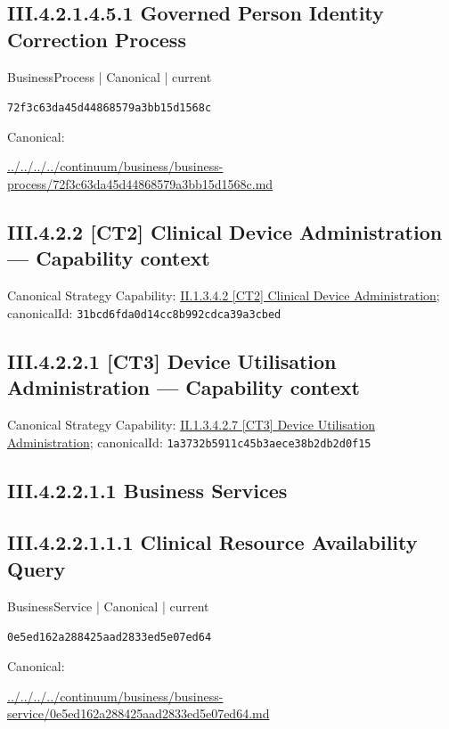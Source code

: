 \documentclass[10pt,a4paper]{article}
\begin{document}
\subsection*{III.4.2.1.4.5.1 Governed Person Identity Correction Process}
\label{element-72f3c63da45d44868579a3bb15d1568c}
{\small BusinessProcess | Canonical | current}\par
\texttt{72f3c63da45d44868579a3bb15d1568c}\par
Canonical: \par
{\footnotesize\url{../../../../continuum/business/business-process/72f3c63da45d44868579a3bb15d1568c.md}}\par
\subsection*{III.4.2.2 [CT2] Clinical Device Administration — Capability context}
Canonical Strategy Capability: \hyperref[element-31bcd6fda0d14cc8b992cdca39a3cbed]{II.1.3.4.2 [CT2] Clinical Device Administration}; canonicalId: \texttt{31bcd6fda0d14cc8b992cdca39a3cbed}\par
\subsection*{III.4.2.2.1 [CT3] Device Utilisation Administration — Capability context}
Canonical Strategy Capability: \hyperref[element-1a3732b5911c45b3aece38b2db2d0f15]{II.1.3.4.2.7 [CT3] Device Utilisation Administration}; canonicalId: \texttt{1a3732b5911c45b3aece38b2db2d0f15}\par
\subsection*{III.4.2.2.1.1 Business Services}
\subsection*{III.4.2.2.1.1.1 Clinical Resource Availability Query}
\label{element-0e5ed162a288425aad2833ed5e07ed64}
{\small BusinessService | Canonical | current}\par
\texttt{0e5ed162a288425aad2833ed5e07ed64}\par
Canonical: \par
{\footnotesize\url{../../../../continuum/business/business-service/0e5ed162a288425aad2833ed5e07ed64.md}}\par
\end{document}

